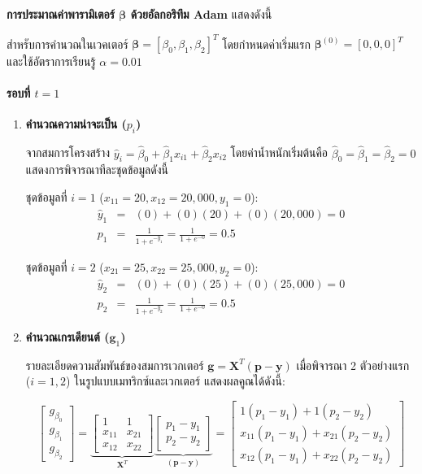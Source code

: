 \noindent
\textbf{การประมาณค่าพารามิเตอร์ $\boldsymbol{\beta}$ ด้วยอัลกอริทึม Adam} แสดงดังนี้

สำหรับการคำนวณในเวคเตอร์ $\boldsymbol{\beta} = [\beta_0, \beta_1, \beta_2]^T$ โดยกำหนดค่าเริ่มแรก $\boldsymbol{\beta}^{(0)} = [0, 0, 0]^T$ และใช้อัตราการเรียนรู้ $\alpha = 0.01$ 

\paragraph{รอบที่ $t = 1$}
\begin{enumerate}
    \item \textbf{คำนวณความน่าจะเป็น ($p_i$)} 
    
    จากสมการโครงสร้าง $\hat{y}_i = \hat{\beta}_0 + \hat{\beta}_1 x_{i1} + \hat{\beta}_2 x_{i2}$ โดยค่าน้ำหนักเริ่มต้นคือ $\hat{\beta}_0 = \hat{\beta}_1 = \hat{\beta}_2 = 0$ แสดงการพิจารณาทีละชุดข้อมูลดังนี้
    
    ชุดข้อมูลที่ $i=1$ ($x_{11} = 20, x_{12} = 20,000, y_1 = 0$):
    \begin{eqnarray} \nonumber
        \hat{y}_1 &=& (0) + (0)(20) + (0)(20,000) = 0 \\ \nonumber
        p_1 &=& \frac{1}{1 + e^{-\hat{y}_1}} = \frac{1}{1 + e^{-0}} = 0.5
    \end{eqnarray}
    
    ชุดข้อมูลที่ $i=2$ ($x_{21} = 25, x_{22} = 25,000, y_2 = 0$):
    \begin{eqnarray} \nonumber
        \hat{y}_2 &=& (0) + (0)(25) + (0)(25,000) = 0 \\ \nonumber
        p_2 &=& \frac{1}{1 + e^{-\hat{y}_2}} = \frac{1}{1 + e^{-0}} = 0.5
    \end{eqnarray}
    
    \item \textbf{คำนวณเกรเดียนต์ ($\mathbf{g}_1$)} 
    
   รายละเอียดความสัมพันธ์ของสมการเวกเตอร์ $\mathbf{g} = \mathbf{X}^T(\mathbf{p} - \mathbf{y})$ เมื่อพิจารณา 2 ตัวอย่างแรก ($i=1, 2$) ในรูปแบบเมทริกซ์และเวกเตอร์ แสดงผลคูณได้ดังนี้:
    
    $$ \begin{bmatrix} g_{\beta_0} \\ g_{\beta_1} \\ g_{\beta_2} \end{bmatrix} = \underbrace{\begin{bmatrix} 1 & 1 \\ x_{11} & x_{21} \\ x_{12} & x_{22} \end{bmatrix}}_{\mathbf{X}^T} \underbrace{\begin{bmatrix} p_1 - y_1 \\ p_2 - y_2 \end{bmatrix}}_{(\mathbf{p} - \mathbf{y})} = \begin{bmatrix} 1(p_1 - y_1) + 1(p_2 - y_2) \\ x_{11}(p_1 - y_1) + x_{21}(p_2 - y_2) \\ x_{12}(p_1 - y_1) + x_{22}(p_2 - y_2) \end{bmatrix} $$
    

\end{enumerate}
